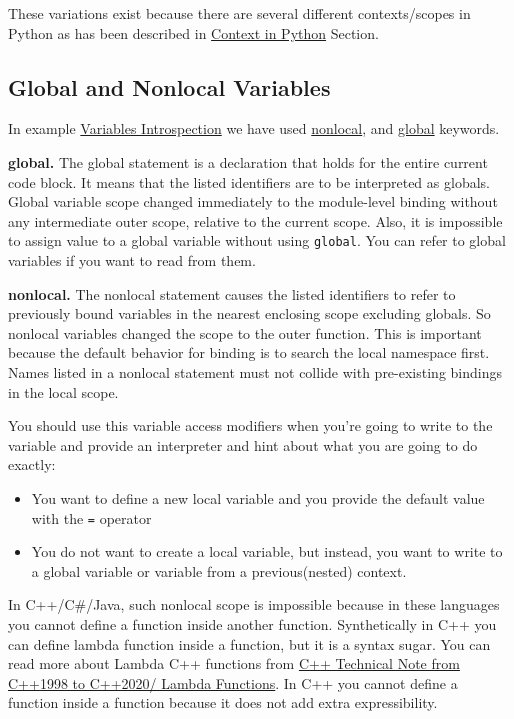 \documentclass[
]{article}
\begin{document}
These variations exist because there are several different
contexts/scopes in Python as has been described in
\protect\hyperlink{context-in-python-is-the-same-as-scopes-in-c}{Context
in Python} Section.

\hypertarget{global-and-nonlocal-variables}{%
\subsection{Global and Nonlocal
Variables}\label{global-and-nonlocal-variables}}

In example \protect\hyperlink{variables-introspection}{Variables
Introspection} we have used
\href{https://docs.python.org/3/reference/simple_stmts.html\#nonlocal}{nonlocal},
and
\href{https://docs.python.org/3/reference/simple_stmts.html\#global}{global}
keywords.

\textbf{global.} The global statement is a declaration that holds for
the entire current code block. It means that the listed identifiers are
to be interpreted as globals. Global variable scope changed immediately
to the module-level binding without any intermediate outer scope,
relative to the current scope. Also, it is impossible to assign value to
a global variable without using \texttt{global}. You can refer to global
variables if you want to read from them.

\textbf{nonlocal.} The nonlocal statement causes the listed identifiers
to refer to previously bound variables in the nearest enclosing scope
excluding globals. So nonlocal variables changed the scope to the outer
function. This is important because the default behavior for binding is
to search the local namespace first. Names listed in a nonlocal
statement must not collide with pre-existing bindings in the local
scope.

You should use this variable access modifiers when you're going to write
to the variable and provide an interpreter and hint about what you are
going to do exactly:

\begin{itemize}
\item
  You want to define a new local variable and you provide the default
  value with the \texttt{=} operator
\item
  You do not want to create a local variable, but instead, you want to
  write to a global variable or variable from a previous(nested)
  context.
\end{itemize}

In C++/C\#/Java, such nonlocal scope is impossible because in these
languages you cannot define a function inside another function.
Synthetically in C++ you can define lambda function inside a function,
but it is a syntax sugar. You can read more about Lambda C++ functions
from
\href{https://github.com/burlachenkok/CPP_from_1998_to_2020/blob/main/Cpp-Technical-Note.md\#lambda-functions}{C++
Technical Note from C++1998 to C++2020/ Lambda Functions}. In C++ you
cannot define a function inside a function because it does not add extra
expressibility.
\end{document}
